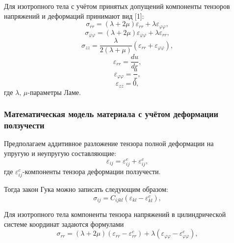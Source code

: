 \documentclass[a4paper,14pt]{extarticle}
\begin{document}
Для изотропного тела с учётом принятых допущений компоненты тензоров напряжений и деформаций принимают вид [1]:
\begin{equation}
\sigma_{rr}=(\lambda+2\mu)\varepsilon_{rr}+\lambda\varepsilon_{\varphi\varphi},
\end{equation}	
\begin{equation}
\sigma_{\varphi\varphi}=(\lambda+2\mu)\varepsilon_{\varphi\varphi}+\lambda\varepsilon_{rr},
\end{equation}
\begin{equation}
\sigma_{zz}=\dfrac{\lambda}{2(\lambda+\mu)}(\varepsilon_{rr}+\varepsilon_{\varphi\varphi}),
\end{equation}
\begin{equation}\label{ElEr}
\varepsilon_{rr}=\frac{du}{dr}, 
\end{equation}
\begin{equation}\label{ElEt}
\varepsilon_{\varphi\varphi}=\frac{u}{r},
\end{equation}
\begin{equation}\label{ElEz}
\varepsilon_{zz}=0,
\end{equation}
где $\lambda$, $\mu$-параметры Ламе. 

\newpage

\subsubsection{Математическая модель материала с учётом деформации ползучести}

Предполагаем аддитивное разложение тензора полной деформации на \\ упругую и неупругую составляющие:
\begin{equation}
\varepsilon_{ij}=\varepsilon_{ij}^{e}+\varepsilon_{ij}^{c},
\end{equation}
где $\varepsilon_{ij}^{c}$-компоненты тензора деформации ползучести.

Тогда закон Гука можно записать следующим образом:
\begin{equation}\label{GukCS}
\sigma_{ij}=C_{ijkl}(\varepsilon_{kl}-\varepsilon^{c}_{kl}),
\end{equation}

Для изотропного тела компоненты тензора напряжений в цилиндрической системе координат задаются формулами
\begin{equation*}
\sigma_{rr}=(\lambda+2\mu)(\varepsilon_{rr}-\varepsilon^{c}_{rr})+\lambda(\varepsilon_{\varphi\varphi}-\varepsilon^{c}_{\varphi\varphi}),
\end{equation*}
\end{document}
